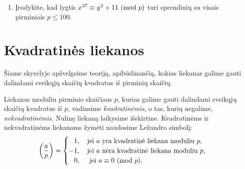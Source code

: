 \begin{enumerate}
  \item {} Įrodykite, kad lygtis $x^{37} \equiv
    y^3 + 11\ (\text{mod } p)$ turi sprendinių su visais pirminiais $p \leq 100$.
\end{enumerate}

\newpage
\section{Kvadratinės liekanos}

Šiame skyrelyje apžvelgsime teoriją, apibūdinančią, kokias liekanas galime
gauti dalindami sveikųjų skaičių kvadratus iš pirminių skaičių. 

\begin{api}
  Liekanas moduliu pirminio skaičiaus $p$, kurias galime gauti dalindami
  sveikųjų skaičių kvadratus iš $p$, vadinsime \emph{kvadratinėmis}, o tas,
  kurių negalime, \emph{nekvadratinėmis}. Nulinę liekaną laikysime
  išskirtine. Kvadratinėms ir nekvadratinėms liekanoms žymėti naudosime
  Ležandro simbolį:
  $$\left(\frac{a}{p}\right) = 
  \begin{cases} 
    \phantom{-}1,\quad \text{jei $a$ yra kvadratinė liekana moduliu $p$,} \\ 
    -1,\quad \text{jei $a$ nėra kvadratinė liekana moduliu $p$,} \\ 
    \phantom{-}0,\quad \text{ jei }a \equiv 0 \ (\text{mod } p).  
  \end{cases}$$
\end{api}

